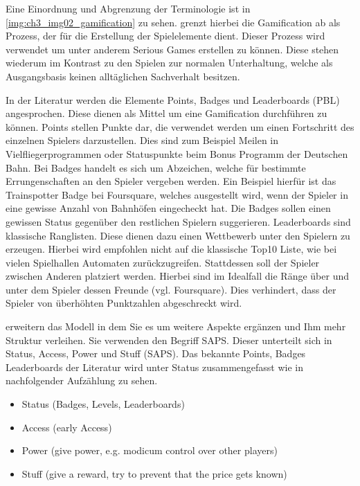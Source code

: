 Eine Einordnung und Abgrenzung der Terminologie ist in \ref{img:ch3_img02_gamification} zu sehen. \textcite{Deterding.2011} grenzt hierbei die Gamification ab als Prozess, der für die Erstellung der Spielelemente dient. Dieser Prozess wird verwendet um unter anderem Serious Games erstellen zu können. Diese stehen wiederum im Kontrast zu den Spielen zur normalen Unterhaltung, welche als Ausgangsbasis keinen alltäglichen Sachverhalt besitzen.

In der Literatur werden die Elemente Points, Badges und Leaderboards (PBL) angesprochen. Diese dienen als Mittel um eine Gamification durchführen zu können. 
Points stellen Punkte dar, die verwendet werden um einen Fortschritt des einzelnen Spielers darzustellen. Dies sind zum Beispiel Meilen in Vielfliegerprogrammen oder Statuspunkte beim Bonus Programm der Deutschen Bahn.
Bei Badges handelt es sich um Abzeichen, welche für bestimmte Errungenschaften an den Spieler vergeben werden. Ein Beispiel hierfür ist das Trainspotter Badge bei Foursquare, welches ausgestellt wird, wenn der Spieler in eine gewisse Anzahl von Bahnhöfen eingecheckt hat. Die Badges sollen einen gewissen Status gegenüber den restlichen Spielern suggerieren.
Leaderboards sind klassische Ranglisten. Diese dienen dazu einen Wettbewerb unter den Spielern zu erzeugen. Hierbei wird empfohlen nicht auf die klassische Top10 Liste, wie bei vielen Spielhallen Automaten zurückzugreifen. Stattdessen soll der Spieler zwischen Anderen platziert werden. Hierbei sind im Idealfall die Ränge über und unter dem Spieler dessen Freunde (vgl. Foursquare). Dies verhindert, dass der Spieler von überhöhten Punktzahlen abgeschreckt wird.

\cite{Zichermann.2011} erweitern das Modell in dem Sie es um weitere Aspekte ergänzen und Ihm mehr Struktur verleihen.
Sie verwenden den Begriff SAPS. Dieser unterteilt sich in Status, Access, Power und Stuff (SAPS).
Das bekannte Points, Badges Leaderboards der Literatur wird unter Status zusammengefasst wie in nachfolgender Aufzählung zu sehen.

\begin{itemize}
\item Status (Badges, Levels, Leaderboards)
\item Access (early Access)
\item Power (give power, e.g. modicum control over other players)
\item Stuff (give a reward, try to prevent that the price gets known)
\end{itemize}


